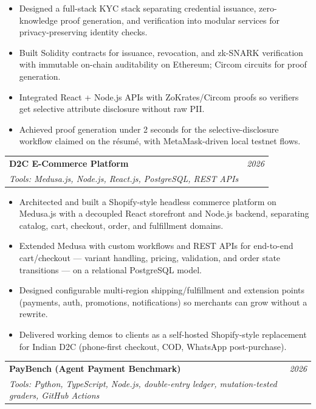 \documentclass[a4paper,11pt]{article}
\makeatletter
\newcommand{\resumeItemListStart}{\begin{justify}\begin{itemize}[leftmargin=3ex, rightmargin=2ex, noitemsep,labelsep=1.2mm,itemsep=0mm]\small}
\newcommand{\resumeItemListEnd}{\end{itemize}\end{justify}\vspace{-2mm}}
\newcommand{\resumeProject}[4]{
\vspace{0.3mm}\item
    \begin{tabular*}{0.98\textwidth}[t]{l@{\extracolsep{\fill}}r}
        \textbf{#1} & \textit{\footnotesize{#3}} \\
        \footnotesize{\textit{#2}} & \footnotesize{#4}
    \end{tabular*}
    \vspace{-2.6mm}
}
\makeatother
\begin{document}
\resumeItemListStart
  \item {Designed a full-stack KYC stack separating credential issuance, zero-knowledge proof generation, and verification into modular services for privacy-preserving identity checks.}
  \item {Built Solidity contracts for issuance, revocation, and zk-SNARK verification with immutable on-chain auditability on Ethereum; Circom circuits for proof generation.}
  \item {Integrated React + Node.js APIs with ZoKrates/Circom proofs so verifiers get selective attribute disclosure without raw PII.}
  \item {Achieved proof generation under 2 seconds for the selective-disclosure workflow claimed on the résumé, with MetaMask-driven local testnet flows.}
\resumeItemListEnd
\vspace{-3mm}

\resumeProject
{  D2C E-Commerce Platform}
{Tools: Medusa.js, Node.js, React.js, PostgreSQL, REST APIs}
{2026}
{}
\vspace{-3mm}

\resumeItemListStart
  \item {Architected and built a Shopify-style headless commerce platform on Medusa.js with a decoupled React storefront and Node.js backend, separating catalog, cart, checkout, order, and fulfillment domains.}
  \item {Extended Medusa with custom workflows and REST APIs for end-to-end cart/checkout --- variant handling, pricing, validation, and order state transitions --- on a relational PostgreSQL model.}
  \item {Designed configurable multi-region shipping/fulfillment and extension points (payments, auth, promotions, notifications) so merchants can grow without a rewrite.}
  \item {Delivered working demos to clients as a self-hosted Shopify-style replacement for Indian D2C (phone-first checkout, COD, WhatsApp post-purchase).}
\resumeItemListEnd
\vspace{-3mm}

\resumeProject
{  PayBench (Agent Payment Benchmark)}
{Tools: Python, TypeScript, Node.js, double-entry ledger, mutation-tested graders, GitHub Actions}
{2026}
{}
\vspace{-3mm}
\end{document}
